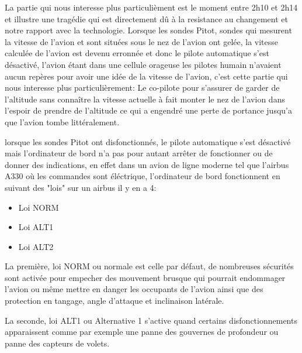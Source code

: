         La partie qui nous interesse plus particulièment est le moment entre 2h10 et 2h14 et illustre 
        une tragédie qui est directement dû à la resistance au changement et notre rapport avec la 
        technologie. \newline 
        Lorsque les sondes Pitot, sondes qui mesurent la vitesse de l'avion et sont situées sous
        le nez de l'avion ont gelée, la vitesse calculée de l'avion est devenu erronnée
        et donc le pilote automatique s'est désactivé, l'avion étant dans une cellule orageuse 
        les pilotes humain n'avaient aucun repères pour avoir une idée de la vitesse de l'avion,
        c'est cette partie qui nous interesse plus particulièrement: 
        Le co-pilote pour s'assurer de garder de l'altitude sans connaître la vitesse actuelle 
        à fait monter le nez de l'avion dans l'espoir de prendre de l'altitude ce qui a engendré 
        une perte de portance jusqu'a que l'avion tombe littéralement. 
        \newline 

        lorsque les sondes Pitot ont disfonctionnés, le pilote automatique s'est désactivé 
        mais l'ordinateur de bord n'a pas pour autant arrêter de fonctionner ou de donner 
        des indications, en effet dans un avion de ligne moderne tel que l'airbus A330
        où les commandes sont éléctrique, l'ordinateur de bord fonctionnent en suivant 
        des "lois" sur un airbus il y en a 4: 
        
        \begin{itemize}
            \item Loi NORM
            \item Loi ALT1
            \item Loi ALT2 
        \end{itemize}

        La première, loi NORM ou normale est celle par défaut, de nombreuses sécurités sont activée pour empecher 
        des mouvement brusque qui pourrait endommager l'avion ou même mettre en danger 
        les occupants de l'avion ainsi que des protection en tangage, angle d'attaque et inclinaison 
        latérale. \newline 

        La seconde, loi ALT1 ou Alternative 1 s'active quand certains disfonctionnements apparaissent
        comme par exemple une panne des gouvernes de profondeur ou panne des capteurs de volets.
        \newline

